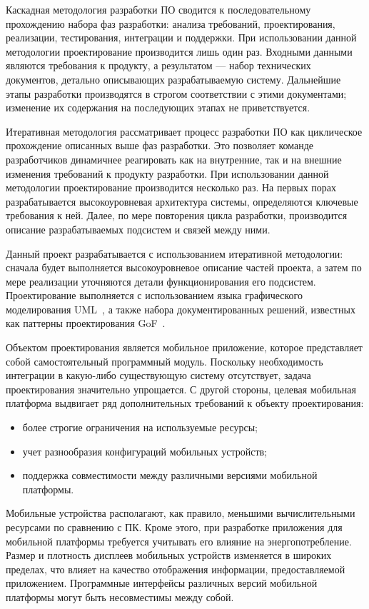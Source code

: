 Каскадная методология разработки ПО сводится к последовательному
прохождению набора фаз разработки:
анализа требований, проектирования, реализации, тестирования, интеграции и поддержки.
При использовании данной методологии проектирование производится
лишь один раз. Входными данными являются требования к продукту,
а результатом --- набор технических документов, детально описывающих
разрабатываемую систему.
Дальнейшие этапы разработки производятся в строгом соответствии с этими документами;
изменение их содержания на последующих этапах не приветствуется.

Итеративная методология рассматривает процесс разработки ПО как
циклическое прохождение описанных выше фаз разработки.
Это позволяет команде разработчиков динамичнее реагировать
как на внутренние, так и на внешние изменения требований к продукту разработки.
При использовании данной методологии проектирование производится несколько раз.
На первых порах разрабатывается высокоуровневая архитектура системы,
определяются ключевые требования к ней. Далее, по мере повторения цикла
разработки, производится описание разрабатываемых подсистем и связей между ними.

Данный проект разрабатывается с использованием итеративной методологии:
сначала будет выполняется высокоуровневое описание частей проекта,
а затем по мере реализации уточняются детали функционирования его подсистем.
Проектирование выполняется с использованием языка графического
моделирования UML~\cite{fowler04}, а также набора документированных решений,
известных как паттерны проектирования GoF~\cite{gamma01}.

Объектом проектирования является мобильное приложение,
которое представляет собой самостоятельный программный модуль.
Поскольку необходимость интеграции в какую-либо существующую
систему отсутствует, задача проектирования значительно упрощается.
С другой стороны, целевая мобильная платформа выдвигает ряд дополнительных
требований к объекту проектирования:
\begin{itemize}
\item более строгие ограничения на используемые ресурсы;
\item учет разнообразия конфигураций мобильных устройств;
\item поддержка совместимости между различными версиями
  мобильной платформы.
\end{itemize}

Мобильные устройства располагают, как правило, меньшими вычислительными
ресурсами по сравнению с ПК. Кроме этого, при разработке приложения для
мобильной платформы требуется учитывать его влияние на энергопотребление.
Размер и плотность дисплеев мобильных устройств изменяется в широких пределах,
что влияет на качество отображения информации, предоставляемой приложением.
Программные интерфейсы различных версий мобильной платформы
могут быть несовместимы между собой.

